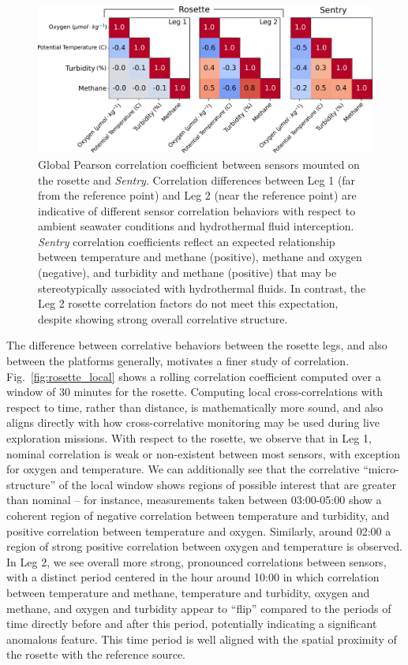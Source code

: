\begin{figure}[h!]
    \centering
    \includegraphics[width=0.9\columnwidth]{figures/chap3_all_global_corr.jpg}
    \caption{Global Pearson correlation coefficient between sensors mounted on the rosette and \emph{Sentry}. Correlation differences between Leg 1 (far from the reference point) and Leg 2 (near the reference point) are indicative of different sensor correlation behaviors with respect to ambient seawater conditions and hydrothermal fluid interception. \emph{Sentry} correlation coefficients reflect an expected relationship between temperature and methane (positive), methane and oxygen (negative), and turbidity and methane (positive) that may be stereotypically associated with hydrothermal fluids. In contrast, the Leg 2 rosette correlation factors do not meet this expectation, despite showing strong overall correlative structure.}
    \label{fig:global_corr}
\end{figure}

The difference between correlative behaviors between the rosette legs, and also between the platforms generally, motivates a finer study of correlation. Fig.~\ref{fig:rosette_local} shows a rolling correlation coefficient computed over a window of 30 minutes for the rosette. Computing local cross-correlations with respect to time, rather than distance, is mathematically more sound, and also aligns directly with how cross-correlative monitoring may be used during live exploration missions. With respect to the rosette, we observe that in Leg 1, nominal correlation is weak or non-existent between most sensors, with exception for oxygen and temperature. We can additionally see that the correlative ``micro-structure'' of the local window shows regions of possible interest that are greater than nominal -- for instance, measurements taken between 03:00-05:00 show a coherent region of negative correlation between temperature and turbidity, and positive correlation between temperature and oxygen. Similarly, around 02:00 a region of strong positive correlation between oxygen and temperature is observed. In Leg 2, we see overall more strong, pronounced correlations between sensors, with a distinct period centered in the hour around 10:00 in which correlation between temperature and methane, temperature and turbidity, oxygen and methane, and oxygen and turbidity appear to ``flip'' compared to the periods of time directly before and after this period, potentially indicating a significant anomalous feature. This time period is well aligned with the spatial proximity of the rosette with the reference source.

